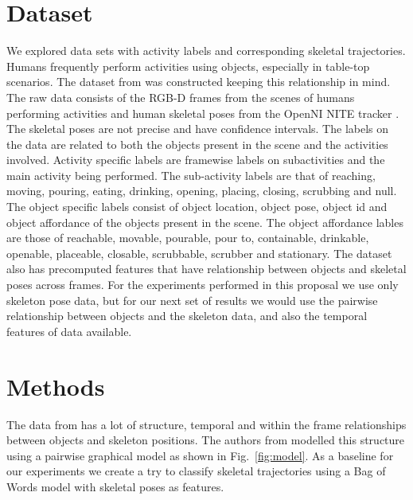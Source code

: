 \documentclass{article} %
\begin{document}
\section{Dataset}
We explored data sets with activity labels and corresponding skeletal trajectories. Humans frequently perform activities using objects, especially in table-top scenarios. The dataset from \cite{koppula2013detectingactivitiesrgbd} was constructed keeping this relationship in mind. The raw data consists of the RGB-D frames from the scenes of humans performing activities and human skeletal poses from the OpenNI NITE tracker \cite{PrimeSense2010}. The skeletal poses are not precise and have confidence intervals. The labels on the data are related to both the objects present in the scene and the activities involved. Activity specific labels are framewise labels on subactivities	and the main activity being performed. The sub-activity labels are that of reaching, moving, pouring, eating, drinking, opening, placing, closing, scrubbing and null. The object specific labels consist of object location, object pose, object id and object affordance of the objects present in the scene. The object affordance lables are those of reachable, movable, pourable, pour to, containable, drinkable, openable, placeable, closable, scrubbable, scrubber and stationary. The dataset also has precomputed features that have relationship between objects and skeletal poses across frames. 
For the experiments performed in this proposal we use only skeleton pose data, but for our next set of results we would use the pairwise relationship between objects and the skeleton data, and also the temporal features of data available.


\section{Methods}
The data from \cite{koppula2013detectingactivitiesrgbd} has a lot of structure, temporal and within the frame relationships between objects and skeleton positions. The authors from \cite{koppula2013detectingactivitiesrgbd} modelled this structure using a pairwise graphical model as shown in Fig.~\ref{fig:model}.
As a baseline for our experiments we create a try to classify skeletal trajectories using a Bag of Words model \cite{Sivic03} with skeletal poses as features.
\end{document}
